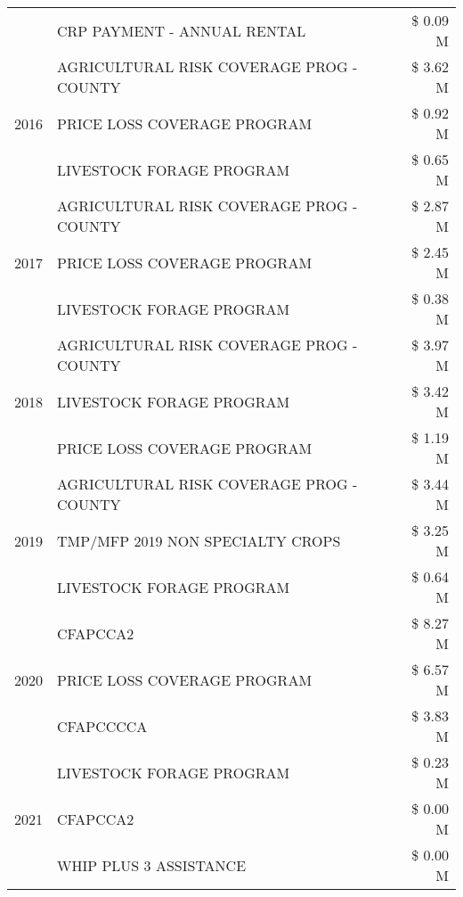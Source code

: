 \begin{tabular}{llr}
 & CRP PAYMENT - ANNUAL RENTAL & \$ 0.09 M \\
\cline{1-3}
\multirow[t]{3}{*}{2016} & AGRICULTURAL RISK COVERAGE PROG - COUNTY & \$ 3.62 M \\
 & PRICE LOSS COVERAGE PROGRAM & \$ 0.92 M \\
 & LIVESTOCK FORAGE PROGRAM & \$ 0.65 M \\
\cline{1-3}
\multirow[t]{3}{*}{2017} & AGRICULTURAL RISK COVERAGE PROG - COUNTY & \$ 2.87 M \\
 & PRICE LOSS COVERAGE PROGRAM & \$ 2.45 M \\
 & LIVESTOCK FORAGE PROGRAM & \$ 0.38 M \\
\cline{1-3}
\multirow[t]{3}{*}{2018} & AGRICULTURAL RISK COVERAGE PROG - COUNTY & \$ 3.97 M \\
 & LIVESTOCK FORAGE PROGRAM & \$ 3.42 M \\
 & PRICE LOSS COVERAGE PROGRAM & \$ 1.19 M \\
\cline{1-3}
\multirow[t]{3}{*}{2019} & AGRICULTURAL RISK COVERAGE PROG - COUNTY & \$ 3.44 M \\
 & TMP/MFP 2019 NON SPECIALTY CROPS & \$ 3.25 M \\
 & LIVESTOCK FORAGE PROGRAM & \$ 0.64 M \\
\cline{1-3}
\multirow[t]{3}{*}{2020} & CFAPCCA2 & \$ 8.27 M \\
 & PRICE LOSS COVERAGE PROGRAM & \$ 6.57 M \\
 & CFAPCCCCA & \$ 3.83 M \\
\cline{1-3}
\multirow[t]{3}{*}{2021} & LIVESTOCK FORAGE PROGRAM & \$ 0.23 M \\
 & CFAPCCA2 & \$ 0.00 M \\
 & WHIP PLUS 3 ASSISTANCE & \$ 0.00 M \\
\cline{1-3}
\bottomrule
\end{tabular}
